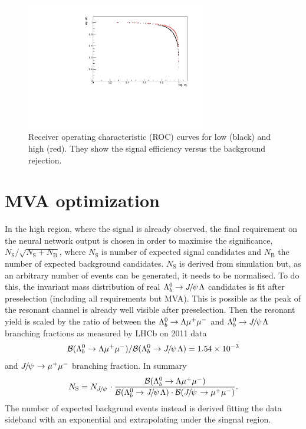 \begin{figure}
\centering
\includegraphics[width=0.7\textwidth]{Lmumu/figs/ROC.pdf}
\caption{Receiver operating characteristic (ROC) curves for low \qsq (black) and high \qsq (red).
They show the signal efficiency versus the background rejection.}
\label{fig:Lb_ROC}
\end{figure}






\section{MVA optimization}
\label{sec:Lb_mva_opt}

In the high \qsq region, where the signal is already observed, the final requirement on the neural network output
is chosen in order to maximise the significance, $N_{\mathrm{S}}/\sqrt{N_{\mathrm{S}}+N_{\mathrm{B}}}$, where
$N_\mathrm{S}$ is number of expected signal candidates and $N_\mathrm{B}$ the number of expected background candidates.
$N_\mathrm{S}$ is derived from simulation but, as an arbitrary number of events can be generated, it
needs to be normalised. To do this, the invariant mass distribution of real $\Lb\to\jpsi\Lz$ candidates
is fit after preselection (including all requirements but MVA). This is possible as the peak of the resonant
channel is already well visible after preselection. Then the resonant yield is scaled by the ratio
of between the ${{\Lambda}^0_{b}}\rightarrow{\ensuremath{\Lambda}}{\ensuremath{\mu^+\mu^-}}$ and $\Lb\to\jpsi\Lz$ branching fractions as measured 
by LHCb on 2011 data 
\begin{equation}
\BR(\Lb\to\Lz\mumu) / \BR(\Lb\to\jpsi\Lz) =  1.54 \times 10^{-3}
\end{equation}
\noindent
and $\jpsi\to\mumu$ branching fraction. In summary
\begin{equation}
N_\mathrm{S} = N_\jpsi \cdot \frac{\BR(\Lb\to\Lz\mumu)}{\BR(\Lb\to\jpsi\Lz) \cdot \BR(\jpsi\to\mumu) }.
\end{equation}
%
The number of expected backgrund events instead is derived fitting the data
sideband with an exponential and extrapolating under the singnal region.

